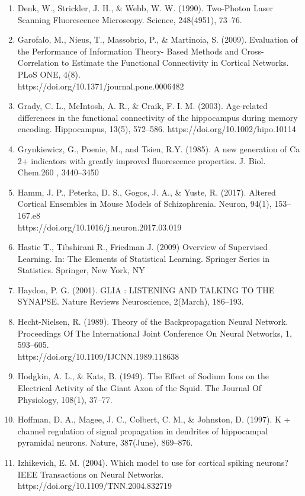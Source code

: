 \documentclass[11pt]{article}
\begin{document}
\begin{enumerate}
\item Denk, W., Strickler, J. H., \& Webb, W. W. (1990). Two-Photon Laser Scanning Fluorescence Microscopy. Science, 248(4951), 73–76.
\item Garofalo, M., Nieus, T., Massobrio, P., \& Martinoia, S. (2009). Evaluation of the Performance of Information Theory- Based Methods and Cross-Correlation to Estimate the Functional Connectivity in Cortical Networks. PLoS ONE, 4(8).\\https://doi.org/10.1371/journal.pone.0006482
\item Grady, C. L., McIntosh, A. R., \& Craik, F. I. M. (2003). Age-related differences in the functional connectivity of the hippocampus during memory encoding. Hippocampus, 13(5), 572–586. https://doi.org/10.1002/hipo.10114
\item Grynkiewicz, G., Poenie, M., and Tsien, R.Y. (1985). A new generation of Ca 2+ indicators with greatly improved fluorescence properties. J. Biol. Chem.260 , 3440–3450
\item Hamm, J. P., Peterka, D. S., Gogos, J. A., \& Yuste, R. (2017). Altered Cortical Ensembles in Mouse Models of Schizophrenia. Neuron, 94(1), 153–167.e8\\https://doi.org/10.1016/j.neuron.2017.03.019
\item Hastie T., Tibshirani R., Friedman J. (2009) Overview of Supervised Learning. In: The Elements of Statistical Learning. Springer Series in Statistics. Springer, New York, NY
\item Haydon, P. G. (2001). GLIA : LISTENING AND TALKING TO THE SYNAPSE. Nature Reviews Neuroscience, 2(March), 186–193.
\item Hecht-Nielsen, R. (1989). Theory of the Backpropagation Neural Network. Proceedings Of The International Joint Conference On Neural Networks, 1, 593–605.\\https://doi.org/10.1109/IJCNN.1989.118638
\item Hodgkin, A. L., \& Kats, B. (1949). The Effect of Sodium Ions on the Electrical Activity of the Giant Axon of the Squid. The Journal Of Physiology, 108(1), 37–77.
\item Hoffman, D. A., Magee, J. C., Colbert, C. M., \& Johnston, D. (1997). K + channel regulation of signal propagation in dendrites of hippocampal pyramidal neurons. Nature, 387(June), 869–876.
\item Izhikevich, E. M. (2004). Which model to use for cortical spiking neurons? IEEE Transactions on Neural Networks. https://doi.org/10.1109/TNN.2004.832719

\end{enumerate}
\end{document}
